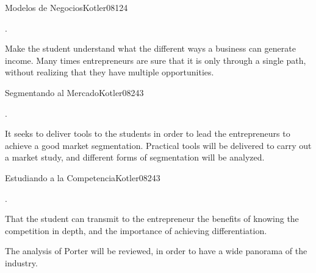 \begin{syllabus}
\begin{outcomes}
    \item {}
    \item {}
\end{outcomes}

\begin{competences}
    \item {}
\end{competences}

\begin{unit}{Modelos de Negocios}{}{Kotler08}{12}{4}
   \begin{topics}
      \item .
   \end{topics}

   \begin{learningoutcomes}
      \item Make the student understand what the different ways a business can generate income. Many times entrepreneurs are sure that it is only through a single path, without realizing that they have multiple opportunities.
   \end{learningoutcomes}

\end{unit}

\begin{unit}{Segmentando al Mercado}{}{Kotler08}{24}{3}
   \begin{topics}
      \item .
   \end{topics}

   \begin{learningoutcomes}
      \item It seeks to deliver tools to the students in order to lead the entrepreneurs to achieve a good market segmentation. Practical tools will be delivered to carry out a market study, and different forms of segmentation will be analyzed.
   \end{learningoutcomes}

\end{unit}

\begin{unit}{Estudiando a la Competencia}{}{Kotler08}{24}{3}
   \begin{topics}
      \item .
   \end{topics}

   \begin{learningoutcomes}
      \item That the student can transmit to the entrepreneur the benefits of knowing the competition in depth, and the importance of achieving differentiation.
      \item The analysis of Porter will be reviewed, in order to have a wide panorama of the industry.
   \end{learningoutcomes}


\end{unit}
\end{syllabus}
